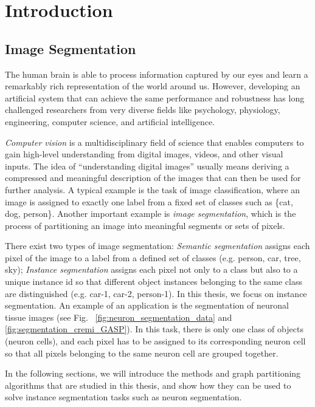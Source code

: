 
\chapter{Introduction}

\section{Image Segmentation}
The human brain is able to process information captured by our eyes and learn a remarkably rich representation of the world around us. However, developing an artificial system that can achieve the same performance and robustness has long challenged researchers from very diverse fields like psychology, physiology, engineering, computer science, and artificial intelligence.

\emph{Computer vision} is a multidisciplinary field of science that enables computers to gain high-level understanding from digital images, videos, and other visual inputs. 
The idea of ``understanding digital images'' usually means deriving a compressed and meaningful description of the images that can then be used for further analysis.
A typical example is the task of image classification, where an image is assigned to exactly one label from a fixed set of classes such as \{cat, dog, person\}. 
Another important example is \emph{image segmentation}, which is the process of partitioning an image into meaningful segments or sets of pixels. 

There exist two types of image segmentation: \emph{Semantic segmentation} assigns each pixel of the image to a label from a defined set of classes (e.g. person, car, tree, sky); \emph{Instance segmentation} assigns each pixel not only to a class but also to a unique instance id so that different object instances belonging to the same class are distinguished (e.g. car-1, car-2, person-1). 
In this thesis, we focus on instance segmentation. An example of an application is the segmentation of neuronal tissue images (see Fig.~ \ref{fig:neuron_segmentation_data} and \ref{fig:segmentation_cremi_GASP}). In this task, there is only one class of objects (neuron cells), and each pixel has to be assigned to its corresponding neuron cell so that all pixels belonging to the same neuron cell are grouped together. 

In the following sections, we will introduce the methods and graph partitioning algorithms that are studied in this thesis, and show how they can be used to solve instance segmentation tasks such as neuron segmentation.


